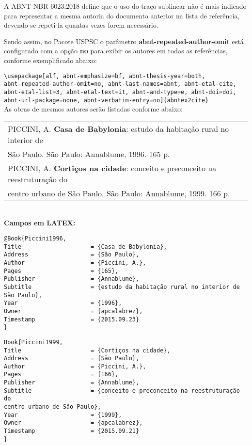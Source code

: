A ABNT NBR 6023:2018 define que o uso do traço sublinear não \'e mais indicado para representar a mesma autoria do documento anterior na lista de refer\^encia, devendo-se repeti-la quantas vezes forem necess\'ario.

Sendo assim, no Pacote USPSC o par\^ametro \textbf{abnt-repeated-author-omit} est\'a configurado com a opção \textbf{no} para exibir os autores em todas as refer\^encias, conforme exemplificado abaixo: 

\verb+\usepackage[alf, abnt-emphasize=bf, abnt-thesis-year=both, + \\ \verb+abnt-repeated-author-omit=no, abnt-last-names=abnt, abnt-etal-cite,+ \\
\verb+abnt-etal-list=3, abnt-etal-text=it, abnt-and-type=e, abnt-doi=doi,+ \\ \verb+abnt-url-package=none, abnt-verbatim-entry=no]{abntex2cite}+ \\

As obras de mesmos autores serão listadas conforme abaixo: \\

\begin{tabular}{|l|c|} \hline
	PICCINI, A. \textbf{Casa de Babylonia}: estudo da habitação rural no interior de \\São Paulo. São Paulo: Annablume, 1996. 165 p. \\
	
	PICCINI, A. \textbf{Cortiços na cidade}: conceito e preconceito na reestruturação do \\centro urbano de  São Paulo. São Paulo: Annablume, 1999. 166 p.   \\\hline
\end{tabular}\\

\textbf{Campos em LATEX:}

\begin{verbatim}
@Book{Piccini1996,
Title                    = {Casa de Babylonia},
Address                  = {São Paulo},
Author                   = {Piccini, A.},
Pages                    = {165},
Publisher                = {Annablume},
Subtitle                 = {estudo da habitação rural no interior de 
São Paulo},
Year                     = {1996},
Owner                    = {apcalabrez},
Timestamp                = {2015.09.23}
}
\end{verbatim}

\begin{verbatim}
Book{Piccini1999,
Title                    = {Cortiços na cidade},
Address                  = {São Paulo},
Author                   = {Piccini, A.},
Pages                    = {166},
Publisher                = {Annablume},
Subtitle                 = {conceito e preconceito na reestruturação do 
centro urbano de São Paulo},
Year                     = {1999},
Owner                    = {apcalabrez},
Timestamp                = {2015.09.21}
}
\end{verbatim}

